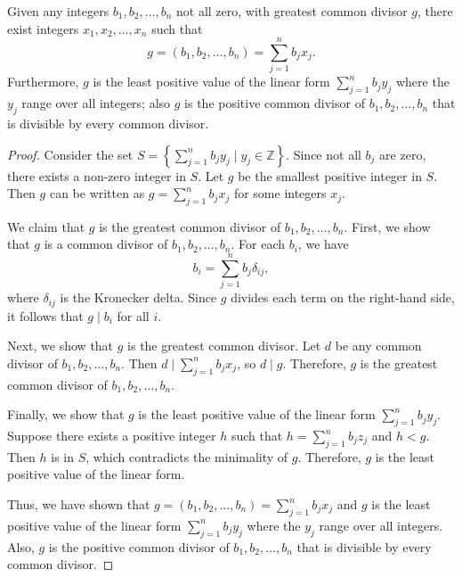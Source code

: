 \documentclass[11pt]{article}
\begin{document}
\begin{theorem}
    Given any integers $b_1, b_2, \ldots, b_n$ not all zero, with greatest common divisor $g$, there exist integers $x_1, x_2, \ldots, x_n$ such that
    \[
        g = (b_1, b_2, \ldots, b_n) = \sum_{j=1}^{n} b_j x_j.
    \]
    Furthermore, $g$ is the least positive value of the linear form $\sum_{j=1}^{n}
        b_j y_j$ where the $y_j$ range over all integers; also $g$ is the positive
    common divisor of $b_1, b_2, \ldots, b_n$ that is divisible by every common
    divisor.
\end{theorem}
\begin{proof}
    Consider the set \( S = \left\{ \sum_{j=1}^{n} b_j y_j \mid y_j \in \mathbb{Z} \right\} \). Since not all \( b_j \) are zero, there exists a non-zero integer in \( S \). Let \( g \) be the smallest positive integer in \( S \). Then \( g \) can be written as \( g = \sum_{j=1}^{n} b_j x_j \) for some integers \( x_j \).

    We claim that \( g \) is the greatest common divisor of \( b_1, b_2, \ldots,
    b_n \). First, we show that \( g \) is a common divisor of \( b_1, b_2, \ldots,
    b_n \). For each \( b_i \), we have
    \[
        b_i = \sum_{j=1}^{n} b_j \delta_{ij},
    \]
    where \( \delta_{ij} \) is the Kronecker delta. Since \( g \) divides each term
    on the right-hand side, it follows that \( g \mid b_i \) for all \( i \).

    Next, we show that \( g \) is the greatest common divisor. Let \( d \) be any
    common divisor of \( b_1, b_2, \ldots, b_n \). Then \( d \mid \sum_{j=1}^{n}
    b_j x_j \), so \( d \mid g \). Therefore, \( g \) is the greatest common
    divisor of \( b_1, b_2, \ldots, b_n \).

    Finally, we show that \( g \) is the least positive value of the linear form \(
    \sum_{j=1}^{n} b_j y_j \). Suppose there exists a positive integer \( h \) such
    that \( h = \sum_{j=1}^{n} b_j z_j \) and \( h < g \). Then \( h \) is in \( S
    \), which contradicts the minimality of \( g \). Therefore, \( g \) is the
    least positive value of the linear form.

    Thus, we have shown that \( g = (b_1, b_2, \ldots, b_n) = \sum_{j=1}^{n} b_j
    x_j \) and \( g \) is the least positive value of the linear form \(
    \sum_{j=1}^{n} b_j y_j \) where the \( y_j \) range over all integers. Also, \(
    g \) is the positive common divisor of \( b_1, b_2, \ldots, b_n \) that is
    divisible by every common divisor.
\end{proof}
\end{document}
